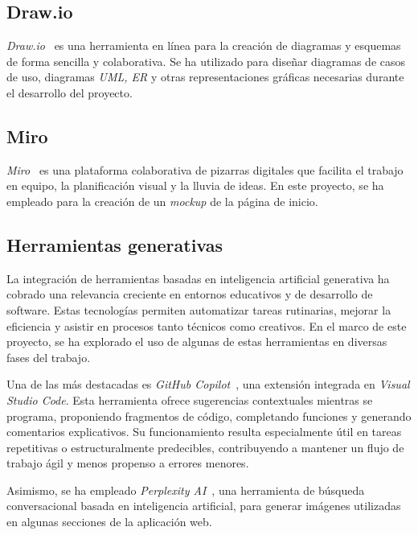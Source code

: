\subsection{Draw.io}

\textit{Draw.io}~\cite{web:drawio} es una herramienta en línea para la creación de diagramas y esquemas de forma sencilla y colaborativa. 
Se ha utilizado para diseñar diagramas de casos de uso, diagramas \textit{UML, ER} y otras representaciones 
gráficas necesarias durante el desarrollo del proyecto.

\subsection{Miro}

\textit{Miro}~\cite{web:miro} es una plataforma colaborativa de pizarras digitales que facilita el trabajo en equipo, la planificación visual y la lluvia de ideas. 
En este proyecto, se ha empleado para la creación de un \textit{mockup} de la página de inicio.

\subsection{Herramientas generativas}

La integración de herramientas basadas en inteligencia artificial generativa ha cobrado una relevancia creciente en entornos educativos y de desarrollo de software. Estas tecnologías permiten automatizar tareas rutinarias, mejorar la eficiencia y asistir en procesos tanto técnicos como creativos. En el marco de este proyecto, se ha explorado el uso de algunas de estas herramientas en diversas fases del trabajo.

Una de las más destacadas es \textit{GitHub Copilot}~\cite{web:copilot}, una extensión integrada en \textit{Visual Studio Code}. Esta herramienta ofrece sugerencias contextuales mientras se programa, proponiendo fragmentos de código, completando funciones y generando comentarios explicativos. Su funcionamiento resulta especialmente útil en tareas repetitivas o estructuralmente predecibles, contribuyendo a mantener un flujo de trabajo ágil y menos propenso a errores menores.

Asimismo, se ha empleado \textit{Perplexity AI}~\cite{web:perplexity}, una herramienta de búsqueda conversacional basada en inteligencia artificial, para generar imágenes utilizadas en algunas secciones de la aplicación web.
